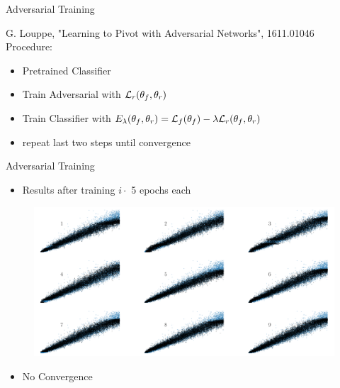 \documentclass[10pt]{beamer}
\begin{document}
\begin{frame}{Adversarial Training}

    \footnotesize{\color{gray} G. Louppe, "Learning to Pivot with Adversarial Networks", 1611.01046} \\
  Procedure:
  \begin{itemize}
  \item Pretrained Classifier
  \item Train Adversarial with  $ {\cal L}_r(\theta_f, \theta_r)$
  \item Train Classifier with $ E_\lambda(\theta_f, \theta_r) = {\cal L}_f(\theta_f) - \lambda {\cal L}_r(\theta_f, \theta_r)$ 
  \item repeat last two steps until convergence
  \end{itemize}

\end{frame}

\begin{frame}{Adversarial Training}
  \begin{itemize}
  \item Results after training $i \cdot$ 5 epochs each   
  \end{itemize}
  \begin{figure}[hbtp]
    \centering
    \includegraphics[width=.9\linewidth]{../images/adv_scatter.png}
  \end{figure}
  \begin{itemize}
  \item No Convergence
  \end{itemize}
\end{frame}
\end{document}

